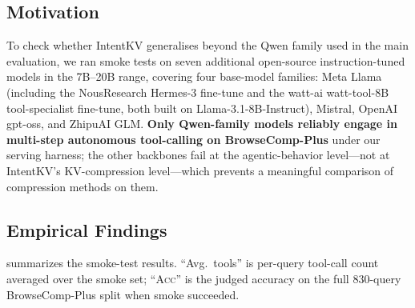 \documentclass[11pt]{article}
\newcommand{\method}{IntentKV\xspace}
\begin{document}
\subsection{Motivation}

To check whether \method generalises beyond the Qwen family used in
the main evaluation, we ran smoke tests on seven additional
open-source instruction-tuned models in the 7B--20B range, covering
four base-model families: Meta Llama (including the NousResearch
Hermes-3 fine-tune and the watt-ai watt-tool-8B tool-specialist
fine-tune, both built on Llama-3.1-8B-Instruct), Mistral, OpenAI
gpt-oss, and ZhipuAI GLM.
\textbf{Only Qwen-family models reliably engage in multi-step
autonomous tool-calling on BrowseComp-Plus} under our serving
harness; the other backbones fail at the agentic-behavior
level---not at \method{}'s KV-compression level---which prevents a
meaningful comparison of compression methods on them.

\subsection{Empirical Findings}

 summarizes the smoke-test results.
``Avg.\ tools'' is per-query tool-call count averaged over the smoke
set; ``\textsc{Acc}'' is the judged accuracy on the full $830$-query
BrowseComp-Plus split when smoke succeeded.
\end{document}
